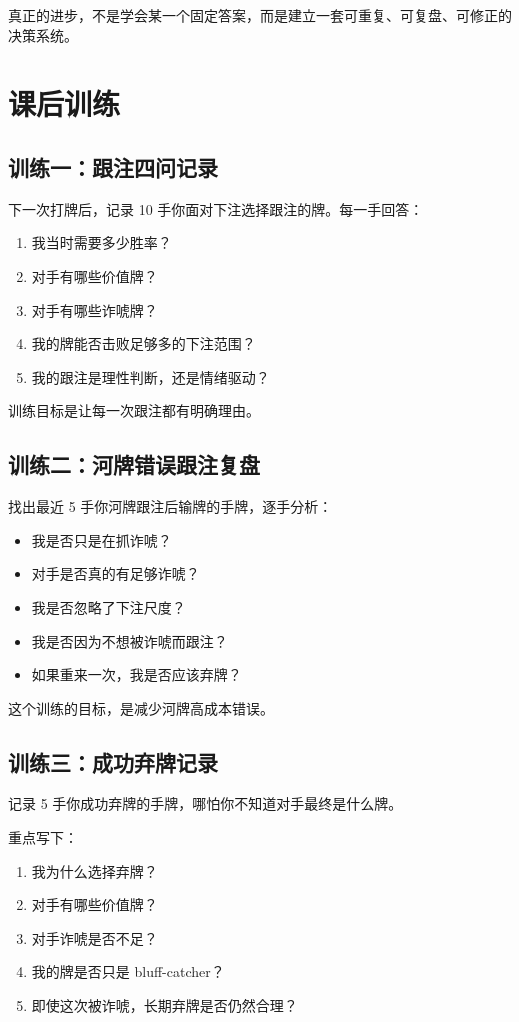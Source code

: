 真正的进步，不是学会某一个固定答案，而是建立一套可重复、可复盘、可修正的决策系统。

\section{课后训练}

\subsection*{训练一：跟注四问记录}

下一次打牌后，记录 10 手你面对下注选择跟注的牌。每一手回答：

\begin{enumerate}
\item 我当时需要多少胜率？
\item 对手有哪些价值牌？
\item 对手有哪些诈唬牌？
\item 我的牌能否击败足够多的下注范围？
\item 我的跟注是理性判断，还是情绪驱动？
\end{enumerate}

训练目标是让每一次跟注都有明确理由。

\subsection*{训练二：河牌错误跟注复盘}

找出最近 5 手你河牌跟注后输牌的手牌，逐手分析：

\begin{itemize}
\item 我是否只是在抓诈唬？
\item 对手是否真的有足够诈唬？
\item 我是否忽略了下注尺度？
\item 我是否因为不想被诈唬而跟注？
\item 如果重来一次，我是否应该弃牌？
\end{itemize}

这个训练的目标，是减少河牌高成本错误。

\subsection*{训练三：成功弃牌记录}

记录 5 手你成功弃牌的手牌，哪怕你不知道对手最终是什么牌。

重点写下：

\begin{enumerate}
\item 我为什么选择弃牌？
\item 对手有哪些价值牌？
\item 对手诈唬是否不足？
\item 我的牌是否只是 bluff-catcher？
\item 即使这次被诈唬，长期弃牌是否仍然合理？
\end{enumerate}

